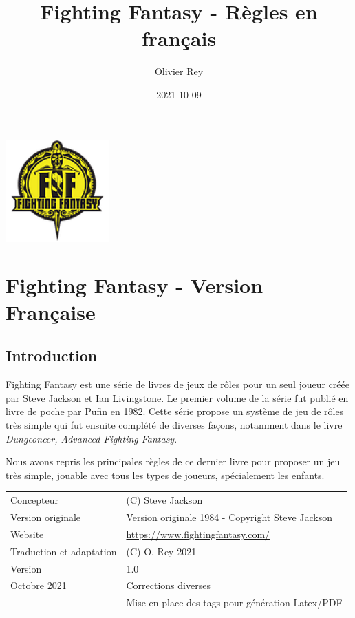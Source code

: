 \documentclass[a4paper, 11pt, twoside]{article}
\author{Olivier Rey}
\date{2021-10-09}
\title{Fighting Fantasy - Règles en français}
\begin{document}
\maketitle
\tableofcontents

\newpage

\begin{center}
\includegraphics[width=4cm]{FF2018.png}
\end{center}

\section{Fighting Fantasy - Version Française}
\label{sec:orgba42f95}

\subsection{Introduction}
\label{sec:org6f537ef}

Fighting Fantasy est une série de livres de jeux de rôles pour un seul joueur créée par Steve Jackson et Ian Livingstone. Le premier volume de la série fut publié en livre de poche par Pufin en 1982. Cette série propose un système de jeu de rôles très simple qui fut ensuite complété de diverses façons, notamment dans le livre \emph{Dungeoneer, Advanced Fighting Fantasy}.

Nous avons repris les principales règles de ce dernier livre pour proposer un jeu très simple, jouable avec tous les types de joueurs, spécialement les enfants.

\begin{longtable}{ll}
Concepteur & (C) Steve Jackson\\
Version originale & Version originale 1984 - Copyright Steve Jackson\\
Website & \href{https://www.fightingfantasy.com/}{https://www.fightingfantasy.com/}\\
Traduction et adaptation & (C) O. Rey 2021\\
Version & 1.0\\
Octobre 2021 & Corrections diverses\\
 & Mise en place des tags pour génération Latex/PDF\\
\end{longtable}
\end{document}
